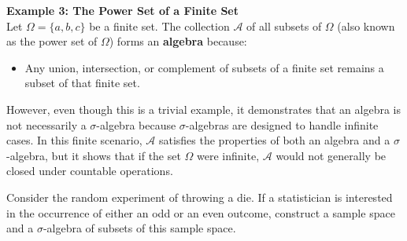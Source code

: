 \textbf{Example 3: The Power Set of a Finite Set} \\

Let $\Omega = \{a, b, c\}$ be a finite set. The collection $\mathcal{A}$ of all subsets of $\Omega$ (also known as the power set of $\Omega$) forms an \textbf{algebra} because:
\begin{itemize}
    \item Any union, intersection, or complement of subsets of a finite set remains a subset of that finite set.
\end{itemize}

However, even though this is a trivial example, it demonstrates that an algebra is not necessarily a $\sigma$-algebra because $\sigma$-algebras are designed to handle infinite cases. In this finite scenario, $\mathcal{A}$ satisfies the properties of both an algebra and a $\sigma$-algebra, but it shows that if the set $\Omega$ were infinite, $\mathcal{A}$ would not generally be closed under countable operations.


\begin{exercise}
    Consider the random experiment of throwing a die. If a statistician is interested in the occurrence of either an odd or an even outcome, construct a sample space and a $\sigma$-algebra of subsets of this sample space.
\end{exercise}

